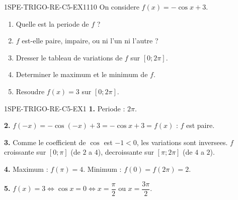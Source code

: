 

\begin{exercice}{1SPE-TRIGO-RE-C5-EX1}{1}{10}
On considere $f(x) = -\cos x + 3$.
\begin{enumerate}
  \item Quelle est la periode de $f$ ?
  \item $f$ est-elle paire, impaire, ou ni l'un ni l'autre ?
  \item Dresser le tableau de variations de $f$ sur $[0;2\pi]$.
  \item Determiner le maximum et le minimum de $f$.
  \item Resoudre $f(x) = 3$ sur $[0;2\pi]$.
\end{enumerate}
\end{exercice}


\begin{corrige}{1SPE-TRIGO-RE-C5-EX1}
\textbf{1.} Periode : $2\pi$.

\textbf{2.} $f(-x) = -\cos(-x) + 3 = -\cos x + 3 = f(x)$ : $f$ est paire.

\textbf{3.} Comme le coefficient de $\cos$ est $-1 < 0$, les variations sont inversees. $f$ croissante sur $[0;\pi]$ (de $2$ a $4$), decroissante sur $[\pi;2\pi]$ (de $4$ a $2$).

\textbf{4.} Maximum : $f(\pi) = 4$. Minimum : $f(0) = f(2\pi) = 2$.

\textbf{5.} $f(x) = 3 \iff \cos x = 0 \iff x = \dfrac{\pi}{2}$ ou $x = \dfrac{3\pi}{2}$.
\end{corrige}

